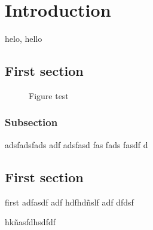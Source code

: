 \chapter{Introduction}
\label{chap:introduction}
helo, hello
\section{First section}
\blindtext[1]
\begin{figure}
	\begin{center}
		
	\end{center}
	\caption{Figure test}
\end{figure}
\blindtext[1]

\subsection{Subsection}
adsfadsfads adf adsfasd fas fads fasdf d

\section{First section}
first adfasdf adf hdfhdñslf adf dfdsf

hkñasfdhsdfdf
